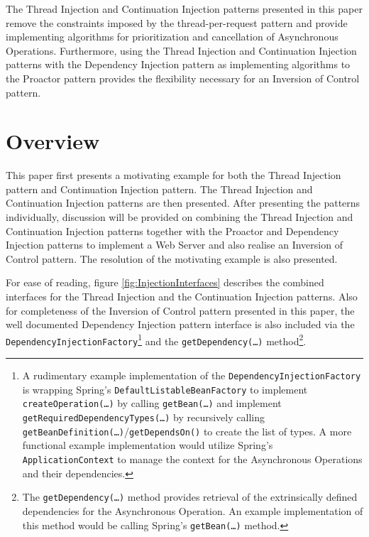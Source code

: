 \documentclass[prodmode]{style/acmlarge}
\begin{document}
The Thread Injection and Continuation Injection patterns presented in this paper
remove the constraints imposed by the thread-per-request pattern and provide
implementing algorithms for prioritization and cancellation of Asynchronous
Operations.  Furthermore, using the Thread Injection and Continuation Injection
patterns with the Dependency Injection pattern \cite{ioc} as implementing
algorithms to the Proactor pattern provides the flexibility necessary for an
Inversion of Control pattern.


\section{Overview}

This paper first presents a motivating example for both the Thread Injection
pattern and Continuation Injection pattern.  The Thread Injection and
Continuation Injection patterns are then presented.  After presenting the
patterns individually, discussion will be provided on combining the Thread
Injection and Continuation Injection patterns together with the Proactor and
Dependency Injection patterns to implement a Web Server and also realise an
Inversion of Control pattern.  The resolution of the motivating example is also
presented.

For ease of reading, figure \ref{fig:InjectionInterfaces} describes the combined
interfaces for the Thread Injection and the Continuation Injection patterns.
Also for completeness of the Inversion of Control pattern presented in this
paper, the well documented Dependency Injection pattern \cite{ioc} interface is
also included via the \texttt{DependencyInjectionFactory}\footnote{A rudimentary
example implementation of the \texttt{DependencyInjectionFactory} is wrapping
Spring's \cite{spring} \texttt{DefaultListableBeanFactory} to implement
\texttt{createOperation(\ldots)} by calling \texttt{getBean(\ldots)} and
implement \texttt{getRequiredDependencyTypes(\ldots)} by recursively calling
\texttt{getBeanDefinition(\ldots)}/\texttt{getDependsOn()} to create the list of
types.  A more functional example implementation would utilize Spring's
\texttt{ApplicationContext} to manage the context for the Asynchronous
Operations and their dependencies.} and the \texttt{getDependency(\ldots)}
method\footnote{The \texttt{getDependency(\ldots)} method provides retrieval of
the extrinsically defined dependencies for the Asynchronous Operation.  An
example implementation of this method would be calling Spring's \cite{spring}
\texttt{getBean(\ldots)} method.}.
\end{document}
